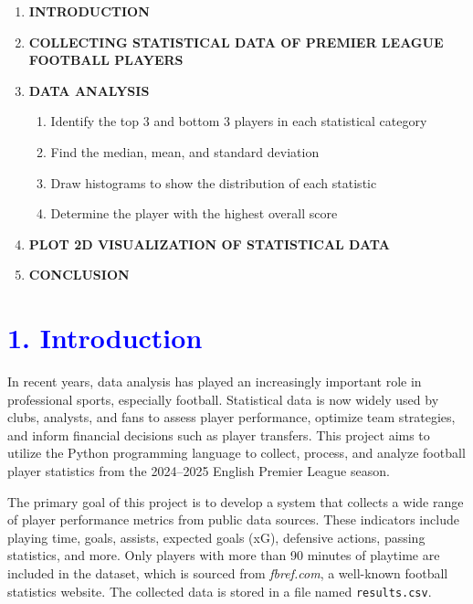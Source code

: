 \documentclass[a4paper,12pt]{article}
\begin{document}
\begin{enumerate}[label=\textbf{\arabic*.}, leftmargin=1.5cm]
    \item \textbf{INTRODUCTION}
    \item \textbf{COLLECTING STATISTICAL DATA OF PREMIER LEAGUE FOOTBALL PLAYERS}
    \item \textbf{DATA ANALYSIS}
    \begin{enumerate}[label=\arabic{enumi}.\arabic*.]
        \item Identify the top 3 and bottom 3 players in each statistical category
        \item Find the median, mean, and standard deviation
        \item Draw histograms to show the distribution of each statistic
        \item Determine the player with the highest overall score
    \end{enumerate}
    \item \textbf{PLOT 2D VISUALIZATION OF STATISTICAL DATA}
    \item \textbf{CONCLUSION}
\end{enumerate}

\newpage
\section*{\textcolor{blue}{\Large 1. Introduction}}

\setlength{\parindent}{0pt}  
\setlength{\parskip}{1em} 
In recent years, data analysis has played an increasingly important role in professional sports, especially football. Statistical data is now widely used by clubs, analysts, and fans to assess player performance, optimize team strategies, and inform financial decisions such as player transfers. This project aims to utilize the Python programming language to collect, process, and analyze football player statistics from the 2024--2025 English Premier League season.

The primary goal of this project is to develop a system that collects a wide range of player performance metrics from public data sources. These indicators include playing time, goals, assists, expected goals (xG), defensive actions, passing statistics, and more. Only players with more than 90 minutes of playtime are included in the dataset, which is sourced from \textit{fbref.com}, a well-known football statistics website. The collected data is stored in a file named \texttt{results.csv}.
\end{document}

